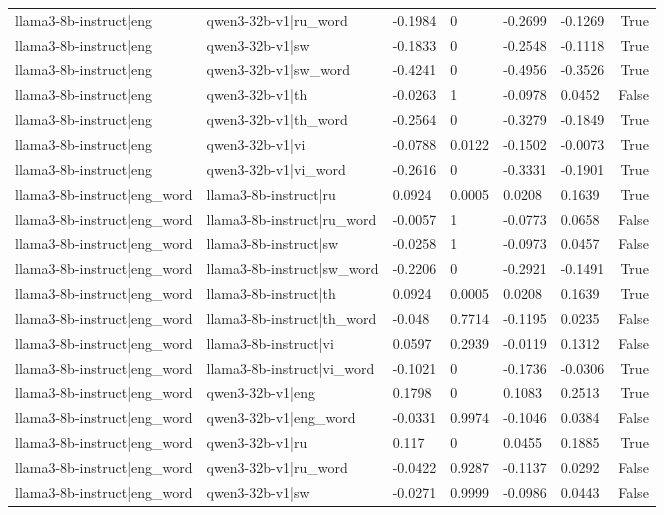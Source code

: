 \begin{table}
\begin{tabular}{llllllr}
llama3-8b-instruct|eng & qwen3-32b-v1|ru_word & -0.1984 & 0 & -0.2699 & -0.1269 & True \\
llama3-8b-instruct|eng & qwen3-32b-v1|sw & -0.1833 & 0 & -0.2548 & -0.1118 & True \\
llama3-8b-instruct|eng & qwen3-32b-v1|sw_word & -0.4241 & 0 & -0.4956 & -0.3526 & True \\
llama3-8b-instruct|eng & qwen3-32b-v1|th & -0.0263 & 1 & -0.0978 & 0.0452 & False \\
llama3-8b-instruct|eng & qwen3-32b-v1|th_word & -0.2564 & 0 & -0.3279 & -0.1849 & True \\
llama3-8b-instruct|eng & qwen3-32b-v1|vi & -0.0788 & 0.0122 & -0.1502 & -0.0073 & True \\
llama3-8b-instruct|eng & qwen3-32b-v1|vi_word & -0.2616 & 0 & -0.3331 & -0.1901 & True \\
llama3-8b-instruct|eng_word & llama3-8b-instruct|ru & 0.0924 & 0.0005 & 0.0208 & 0.1639 & True \\
llama3-8b-instruct|eng_word & llama3-8b-instruct|ru_word & -0.0057 & 1 & -0.0773 & 0.0658 & False \\
llama3-8b-instruct|eng_word & llama3-8b-instruct|sw & -0.0258 & 1 & -0.0973 & 0.0457 & False \\
llama3-8b-instruct|eng_word & llama3-8b-instruct|sw_word & -0.2206 & 0 & -0.2921 & -0.1491 & True \\
llama3-8b-instruct|eng_word & llama3-8b-instruct|th & 0.0924 & 0.0005 & 0.0208 & 0.1639 & True \\
llama3-8b-instruct|eng_word & llama3-8b-instruct|th_word & -0.048 & 0.7714 & -0.1195 & 0.0235 & False \\
llama3-8b-instruct|eng_word & llama3-8b-instruct|vi & 0.0597 & 0.2939 & -0.0119 & 0.1312 & False \\
llama3-8b-instruct|eng_word & llama3-8b-instruct|vi_word & -0.1021 & 0 & -0.1736 & -0.0306 & True \\
llama3-8b-instruct|eng_word & qwen3-32b-v1|eng & 0.1798 & 0 & 0.1083 & 0.2513 & True \\
llama3-8b-instruct|eng_word & qwen3-32b-v1|eng_word & -0.0331 & 0.9974 & -0.1046 & 0.0384 & False \\
llama3-8b-instruct|eng_word & qwen3-32b-v1|ru & 0.117 & 0 & 0.0455 & 0.1885 & True \\
llama3-8b-instruct|eng_word & qwen3-32b-v1|ru_word & -0.0422 & 0.9287 & -0.1137 & 0.0292 & False \\
llama3-8b-instruct|eng_word & qwen3-32b-v1|sw & -0.0271 & 0.9999 & -0.0986 & 0.0443 & False \\

\end{tabular}
\end{table}
